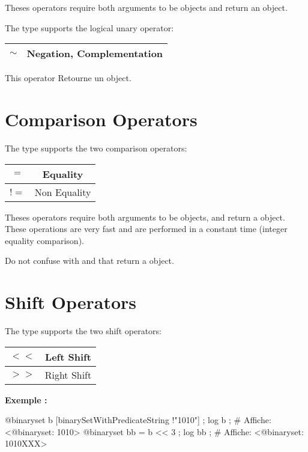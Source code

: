 Theses operators require both arguments to be  objects and return an  object.\newline


The  type supports the logical unary operator:\newline

\begin{tabular}{|c|c|}
\hline
$\sim$ & Negation, Complementation \\
\hline
\end{tabular}

This operator Retourne un  object.







\section{Comparison Operators}

The  type supports the two comparison operators:\newline

\begin{tabular}{|c|c|}
\hline
$=$ & Equality \\
\hline
$!=$ & Non Equality \\
\hline
\end{tabular}

Theses operators require both arguments to be  objects, and return a  object. These operations are very fast and are performed in a constant time (integer equality comparison).

Do not confuse with  and  that return a  object.







\section{Shift Operators}

The  type supports the two shift operators:\newline

\begin{tabular}{|c|c|}
\hline
$<<$ & Left Shift \\
\hline
$>>$ & Right Shift \\
\hline
\end{tabular}

\textbf{Exemple :}
\begin{galgascode}
@binaryset b [binarySetWithPredicateString !"1010"] ;
log b ; # Affiche: <@binaryset: 1010>
@binaryset bb = b << 3 ;
log bb ; # Affiche: <@binaryset: 1010XXX>
\end{galgascode}


